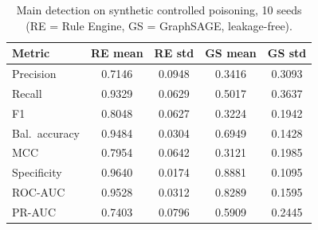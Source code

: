 \begin{table}[t]
\centering
\small
\caption{Main detection on synthetic controlled poisoning, 10 seeds (RE = Rule Engine, GS = GraphSAGE, leakage-free).}
\label{tab:main}
\begin{tabular}{lcccc}
\toprule
Metric & RE mean & RE std & GS mean & GS std \\
\midrule
Precision & 0.7146 & 0.0948 & 0.3416 & 0.3093 \\
Recall & 0.9329 & 0.0629 & 0.5017 & 0.3637 \\
F1 & 0.8048 & 0.0627 & 0.3224 & 0.1942 \\
Bal.\ accuracy & 0.9484 & 0.0304 & 0.6949 & 0.1428 \\
MCC & 0.7954 & 0.0642 & 0.3121 & 0.1985 \\
Specificity & 0.9640 & 0.0174 & 0.8881 & 0.1095 \\
ROC-AUC & 0.9528 & 0.0312 & 0.8289 & 0.1595 \\
PR-AUC & 0.7403 & 0.0796 & 0.5909 & 0.2445 \\
\bottomrule
\end{tabular}
\end{table}
